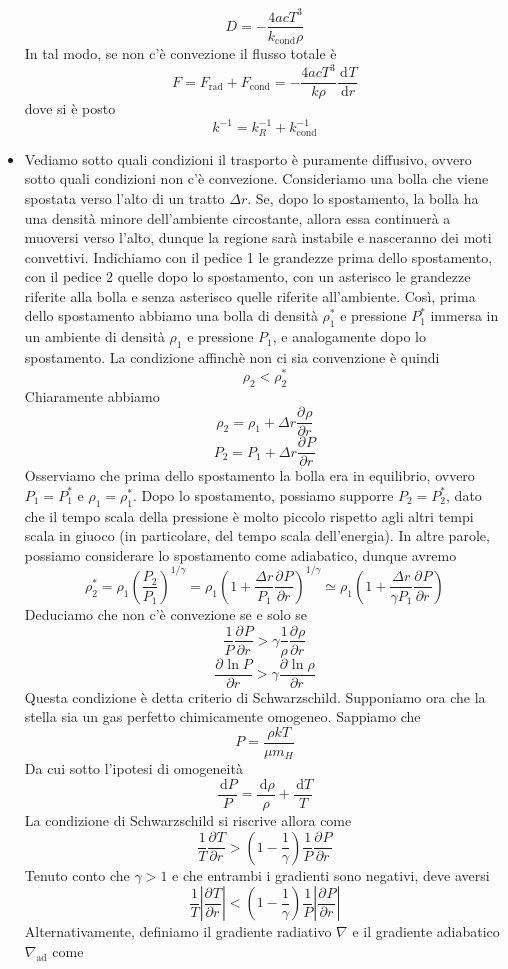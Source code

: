 \documentclass[a4paper,11pt]{article}
\renewcommand{\d}{\mathrm{d}} %
\newcommand{\der}[3][]{\frac{\d ^{#1}#2}{\d {#3}^{#1}}} %
\newcommand{\pder}[3][]{\frac{\partial ^{#1}#2}{\partial {#3}^{#1}}} %
\let\oldnabla\nabla %
\renewcommand{\nabla}{\vec{\oldnabla}} %
\renewcommand{\d}{\,\mathrm{d}}
\theoremstyle{theorem}
\theoremstyle{definition}
\begin{document}
\begin{itemize}
		\[D=-\frac{4acT^3}{k_\textrm{cond}\rho}\]
		In tal modo, se non c'è convezione il flusso totale è
		\[F=F_\textrm{rad}+F_\textrm{cond}=-\frac{4acT^3}{k\rho}\der{T}{r}\]
		dove si è posto
		\[k^{-1}=k_R^{-1}+k_\textrm{cond}^{-1}\]
		\item Vediamo sotto quali condizioni il trasporto è puramente diffusivo, ovvero sotto quali condizioni non c'è convezione. Consideriamo una bolla che viene spostata verso l'alto di un tratto $\Delta r$. Se, dopo lo spostamento, la bolla ha una densità minore dell'ambiente circostante, allora essa continuerà a muoversi verso l'alto, dunque la regione sarà instabile e nasceranno dei moti convettivi. Indichiamo con il pedice 1 le grandezze prima dello spostamento, con il pedice 2 quelle dopo lo spostamento, con un asterisco le grandezze riferite alla bolla e senza asterisco quelle riferite all'ambiente. Così, prima dello spostamento abbiamo una bolla di densità $\rho_1^*$ e pressione $P_1^*$ immersa in un ambiente di densità $\rho_1$ e pressione $P_1$, e analogamente dopo lo spostamento. La condizione affinchè non ci sia convenzione è quindi
		\[\rho_2<\rho_2^*\]
		Chiaramente abbiamo
		\[\rho_2=\rho_1+\Delta r\pder{\rho}{r}\]
		\[P_2=P_1+\Delta r\pder{P}{r}\]
		Osserviamo che prima dello spostamento la bolla era in equilibrio, ovvero $P_1=P_1^*$ e $\rho_1=\rho_1^*$. Dopo lo spostamento, possiamo supporre $P_2=P_2^*$, dato che il tempo scala della pressione è molto piccolo rispetto agli altri tempi scala in giuoco (in particolare, del tempo scala dell'energia). In altre parole, possiamo considerare lo spostamento come adiabatico, dunque avremo
		\[\rho_2^*=\rho_1\left(\frac{P_2}{P_1}\right)^{1/\gamma}=\rho_1\left(1+\frac{\Delta r}{P_1}\pder{P}{r}\right)^{1/\gamma}\simeq\rho_1\left(1+\frac{\Delta r}{\gamma P_1}\pder{P}{r}\right)\]
		Deduciamo che non c'è convezione se e solo se
		\[\frac{1}{P}\pder{P}{r}>\gamma\frac{1}{\rho}\pder{\rho}{r}\]
		\[\pder{\ln P}{r}>\gamma\pder{\ln \rho}{r}\]
		Questa condizione è detta criterio di Schwarzschild.  Supponiamo ora che la stella sia un gas perfetto chimicamente omogeneo. Sappiamo che
		\[P=\frac{\rho kT}{\mu m_H}\]
		Da cui sotto l'ipotesi di omogeneità
		\[\frac{\d P}{P}=\frac{\d\rho}{\rho}+\frac{\d T}{T}\]
		La condizione di Schwarzschild si riscrive allora come
		\[\frac{1}{T}\pder{T}{r}>\left(1-\frac{1}{\gamma}\right)\frac{1}{P}\pder{P}{r}\]
		Tenuto conto che $\gamma>1$ e che entrambi i gradienti sono negativi, deve aversi
		\[\frac{1}{T}\left|\pder{T}{r}\right|<\left(1-\frac{1}{\gamma}\right)\frac{1}{P}\left|\pder{P}{r}\right|\]
		Alternativamente, definiamo il gradiente radiativo $\oldnabla$ e il gradiente adiabatico $\oldnabla_\textrm{ad}$ come

\end{itemize}
\end{document}
